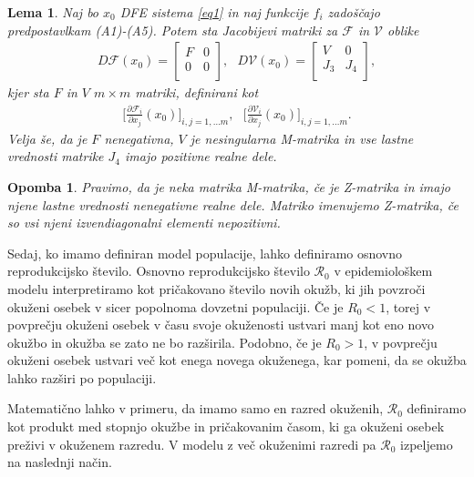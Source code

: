 \documentclass[a4paper,12pt]{article}
\newcommand{\todo}[1]{{\color{red}{#1}}}
\newcommand{\R}{\mathcal R}
\newcommand{\F}{\mathcal F}
\newcommand{\V}{\mathcal V}
\newtheorem{lema}{Lema}
\newtheorem{opomba}{Opomba}
\begin{document}
\begin{lema} \label{lema1}
    Naj bo \(x_0\) DFE sistema \ref{eq1} in naj funkcije \(f_i\) zadoščajo predpostavlkam
    (A1)-(A5). Potem sta Jacobijevi matriki za \(\F\) in \(\V\) oblike
    \begin{align*}
        D\F(x_0)= 
        \begin{bmatrix}
        F & 0 \\
        0 & 0 \\
        \end{bmatrix},\textrm{ }
        D\V(x_0)=
        \begin{bmatrix}
        V & 0 \\
        J_3 & J_4 \\
        \end{bmatrix},
    \end{align*}
    kjer sta \(F\) in \(V\) \(m\times m\) matriki, definirani kot
    \begin{align*}
        \big[\frac{\partial \F_i}{\partial x_j}(x_0)\big]_{i,j=1,\ldots m},\textrm{ }
        \big[\frac{\partial \V_i}{\partial x_j}(x_0)\big]_{i,j=1,\ldots m}.
    \end{align*}
    Velja še, da je \(F\) nenegativna, \(V\) je nesingularna M-matrika in vse lastne
    vrednosti matrike \(J_4\) imajo pozitivne realne dele.
\end{lema}

\begin{opomba}
    Pravimo, da je neka matrika M-matrika, če je Z-matrika in imajo njene lastne
    vrednosti nenegativne realne dele. Matriko imenujemo Z-matrika, če so vsi njeni
    izvendiagonalni elementi nepozitivni.
\end{opomba}

\todo{dokaz}

Sedaj, ko imamo definiran model populacije, lahko definiramo osnovno reprodukcijsko
število. Osnovno reprodukcijsko število \(\R_0\) v epidemiološkem modelu interpretiramo
kot pričakovano število novih okužb, ki jih povzroči okuženi osebek v sicer popolnoma
dovzetni populaciji. Če je \(R_0<1\), torej v povprečju okuženi osebek v času svoje
okuženosti ustvari manj kot eno novo okužbo in okužba se zato ne bo razširila. Podobno, če je 
\(R_0>1\), v povprečju okuženi osebek ustvari več kot enega novega okuženega, kar pomeni,
da se okužba lahko razširi po populaciji. 

Matematično lahko v primeru, da imamo samo en razred okuženih, \(\R_0\) definiramo
kot produkt med stopnjo okužbe in pričakovanim časom, ki ga okuženi osebek preživi 
v okuženem razredu. V modelu z več okuženimi razredi pa \(\R_0\) izpeljemo na naslednji način.
\end{document}
